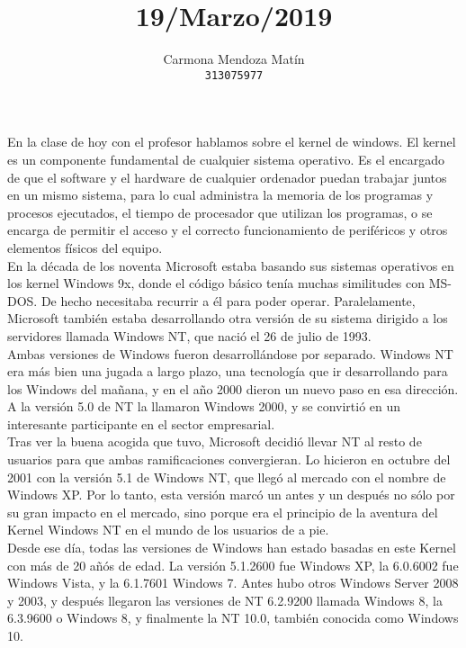 \documentclass[11pt, a4paper]{report}
\begin{document}
\title{19/Marzo/2019}
\author{
  Carmona Mendoza Mat\'in\\
  \texttt{313075977}
}
\date{}
\maketitle

En la clase de hoy con el profesor hablamos sobre el kernel de windows. El
kernel es un componente fundamental de cualquier sistema operativo. Es el
encargado de que el software y el hardware de cualquier ordenador puedan
trabajar juntos en un mismo sistema, para lo cual administra la memoria de los
programas y procesos ejecutados, el tiempo de procesador que utilizan los
programas, o se encarga de permitir el acceso y el correcto funcionamiento de
periféricos y otros elementos físicos del equipo. \\

En la década de los noventa Microsoft estaba basando sus sistemas operativos en
los kernel Windows 9x, donde el código básico tenía muchas similitudes con
MS-DOS. De hecho necesitaba recurrir a él para poder operar. Paralelamente,
Microsoft también estaba desarrollando otra versión de su sistema dirigido a
los servidores llamada Windows NT, que nació el 26 de julio de 1993. \\

Ambas versiones de Windows fueron desarrollándose por separado. Windows NT era
más bien una jugada a largo plazo, una tecnología que ir desarrollando para los
Windows del mañana, y en el año 2000 dieron un nuevo paso en esa dirección. A
la versión 5.0 de NT la llamaron Windows 2000, y se convirtió en un interesante
participante en el sector empresarial. \\

Tras ver la buena acogida que tuvo, Microsoft decidió llevar NT al resto de
usuarios para que ambas ramificaciones convergieran. Lo hicieron en octubre del
2001 con la versión 5.1 de Windows NT, que llegó al mercado con el nombre de
Windows XP. Por lo tanto, esta versión marcó un antes y un después no sólo por
su gran impacto en el mercado, sino porque era el principio de la aventura del
Kernel Windows NT en el mundo de los usuarios de a pie. \\

Desde ese día, todas las versiones de Windows han estado basadas en este Kernel
con más de 20 añós de edad. La versión 5.1.2600 fue Windows XP, la 6.0.6002 fue
Windows Vista, y la 6.1.7601 Windows 7. Antes hubo otros Windows Server 2008 y
2003, y después llegaron las versiones de NT 6.2.9200 llamada Windows 8, la
6.3.9600 o Windows 8, y finalmente la NT 10.0, también conocida como Windows
10. \\
\end{document}
